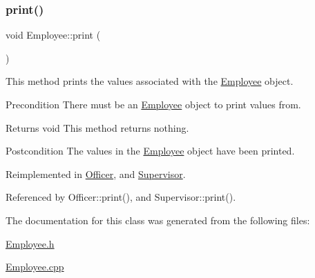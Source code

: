 \mbox{\label{classEmployee_a79556ad700627dba88049f487a34a762}} 
\subsubsection{\texorpdfstring{print()}{print()}}
{\footnotesize\ttfamily void Employee\+::print (\begin{DoxyParamCaption}{ }\end{DoxyParamCaption})\hspace{0.3cm}{\ttfamily [virtual]}}

This method prints the values associated with the \hyperlink{classEmployee}{Employee} object.

\begin{DoxyPrecond}{Precondition}
There must be an \hyperlink{classEmployee}{Employee} object to print values from. 
\end{DoxyPrecond}
\begin{DoxyReturn}{Returns}
void This method returns nothing. 
\end{DoxyReturn}
\begin{DoxyPostcond}{Postcondition}
The values in the \hyperlink{classEmployee}{Employee} object have been printed. 
\end{DoxyPostcond}


Reimplemented in \hyperlink{classOfficer_aeadece05a1a0b7fb29bd412830d2e07a}{Officer}, and \hyperlink{classSupervisor_a92483dc9a54904d79b46c6ec4efb3f54}{Supervisor}.



Referenced by Officer\+::print(), and Supervisor\+::print().



The documentation for this class was generated from the following files\+:\begin{DoxyCompactItemize}
\item 
\hyperlink{Employee_8h}{Employee.\+h}\item 
\hyperlink{Employee_8cpp}{Employee.\+cpp}\end{DoxyCompactItemize}
